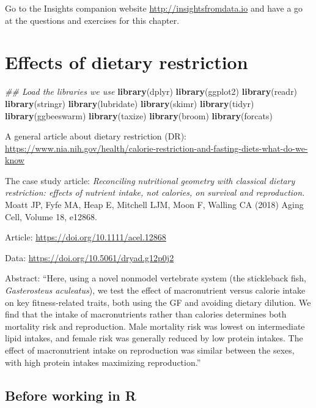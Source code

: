 \documentclass[]{book}
\newenvironment{Shaded}{\begin{snugshade}}{\end{snugshade}}
\newcommand{\CommentTok}[1]{\textcolor[rgb]{0.56,0.35,0.01}{\textit{#1}}}
\newcommand{\KeywordTok}[1]{\textcolor[rgb]{0.13,0.29,0.53}{\textbf{#1}}}
\newcommand{\NormalTok}[1]{#1}
\begin{document}
Go to the Insights companion website \url{http://insightsfromdata.io} and have a go at the questions and exercises for this chapter.

\hypertarget{WFD-4}{%
\chapter{Effects of dietary restriction}\label{WFD-4}}

\begin{Shaded}
\begin{Highlighting}[]
\CommentTok{## Load the libraries we use}
\KeywordTok{library}\NormalTok{(dplyr)}
\KeywordTok{library}\NormalTok{(ggplot2)}
\KeywordTok{library}\NormalTok{(readr)}
\KeywordTok{library}\NormalTok{(stringr)}
\KeywordTok{library}\NormalTok{(lubridate)}
\KeywordTok{library}\NormalTok{(skimr)}
\KeywordTok{library}\NormalTok{(tidyr)}
\KeywordTok{library}\NormalTok{(ggbeeswarm)}
\KeywordTok{library}\NormalTok{(taxize)}
\KeywordTok{library}\NormalTok{(broom)}
\KeywordTok{library}\NormalTok{(forcats)}
\end{Highlighting}
\end{Shaded}

A general article about dietary restriction (DR): \url{https://www.nia.nih.gov/health/calorie-restriction-and-fasting-diets-what-do-we-know}

The case study article: \emph{Reconciling nutritional geometry with classical dietary restriction: effects of nutrient intake, not calories, on survival and reproduction.} Moatt JP, Fyfe MA, Heap E, Mitchell LJM, Moon F, Walling CA (2018) Aging Cell, Volume 18, e12868.

Article: \url{https://doi.org/10.1111/acel.12868}

Data: \url{https://doi.org/10.5061/dryad.g12p0j2}

Abstract: ``Here, using a novel nonmodel vertebrate system (the stickleback fish, \emph{Gasterosteus aculeatus}), we test the effect of macronutrient versus calorie intake on key fitness‐related traits, both using the GF and avoiding dietary dilution. We find that the intake of macronutrients rather than calories determines both mortality risk and reproduction. Male mortality risk was lowest on intermediate lipid intakes, and female risk was generally reduced by low protein intakes. The effect of macronutrient intake on reproduction was similar between the sexes, with high protein intakes maximizing reproduction.''

\hypertarget{before-working-in-r}{%
\section{Before working in R}\label{before-working-in-r}}
\end{document}
